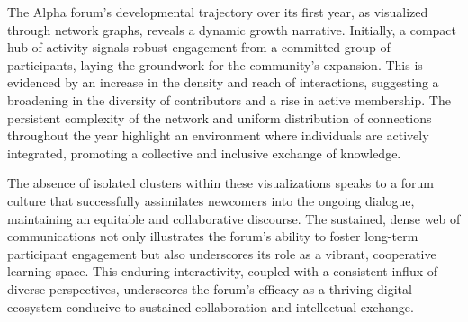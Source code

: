\hfill
\begin{minipage}[t]{0.25\textwidth}
  \vspace{8mm}
  \small
  The Alpha forum's developmental trajectory over its first year, as visualized through network graphs, reveals a dynamic growth narrative. Initially, a compact hub of activity signals robust engagement from a committed group of participants, laying the groundwork for the community's expansion. This is evidenced by an increase in the density and reach of interactions, suggesting a broadening in the diversity of contributors and a rise in active membership. The persistent complexity of the network and uniform distribution of connections throughout the year highlight an environment where individuals are actively integrated, promoting a collective and inclusive exchange of knowledge.

  \medskip
  The absence of isolated clusters within these visualizations speaks to a forum culture that successfully assimilates newcomers into the ongoing dialogue, maintaining an equitable and collaborative discourse. The sustained, dense web of communications not only illustrates the forum's ability to foster long-term participant engagement but also underscores its role as a vibrant, cooperative learning space. This enduring interactivity, coupled with a consistent influx of diverse perspectives, underscores the forum's efficacy as a thriving digital ecosystem conducive to sustained collaboration and intellectual exchange.

\end{minipage}

